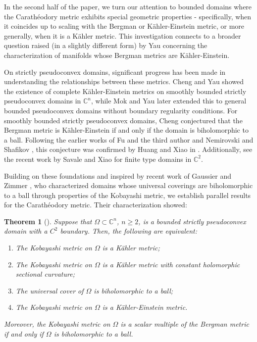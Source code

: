 \documentclass[12pt] {article}
\newtheorem{theorem}{Theorem}[section]
\numberwithin{equation}{section}
\begin{document}
In the second half of the paper, we turn our attention to bounded domains where the Carath\'eodory metric exhibits special geometric properties - specifically, when it coincides up to scaling with the Bergman or K\"ahler-Einstein metric, or more generally, when it is a K\"ahler metric. This investigation connects to a broader question raised (in a slightly different form)  by Yau \cite[pp. 679]{Yau} concerning the characterization of manifolds whose Bergman metrics are K\"{a}hler-Einstein.

 
 
\medskip



On strictly pseudoconvex domains, significant progress has been made in understanding the relationships between these metrics. Cheng and Yau \cite{CY} showed the existence of complete K\"ahler-Einstein metrics on smoothly bounded strictly pseudoconvex domains  in $\mathbb{C}^n$, while Mok and Yau \cite{MY83} later extended this to general bounded pseudoconvex domains without boundary regularity conditions. 
For smoothly bounded strictly pseudoconvex domains, Cheng conjectured that the Bergman metric is K\"{a}hler-Einstein if and only if the domain is biholomorphic to a ball. Following the earlier works of Fu and the third author \cite{FW} and Nemirovski and Shafikov \cite{NS}, this conjecture was confirmed by Huang and Xiao in \cite{HX}. Additionally, see the recent work \cite{SX} by Savale and Xiao for finite type domains in $\mathbb{C}^2$.

 
 
     \medskip
     
     
 
 
 
 
  Building on these foundations and inspired by recent work of Gaussier and Zimmer  \cite{GZ}, who characterized domains whose universal coverings are biholomorphic to a ball through properties of the Kobayashi metric, we establish parallel results for the Carath\'eodory metric. Their characterization showed:
  
  
   
\begin{theorem}[\cite{GZ}] \label{thm:spcv}
Suppose that $\Omega \subset \mathbb{C}^n$, $n \geq 2$, is a bounded strictly pseudoconvex domain with a $C^2$ boundary. Then, the following are equivalent:
\begin{enumerate}
\item [$(a)$] The Kobayashi metric on $\Omega$ is a K\"ahler metric;
\item [$(b)$] The Kobayashi metric on $\Omega$ is a K\"ahler metric with constant holomorphic sectional curvature;
\item [$(c)$] The universal cover of $\Omega$ is biholomorphic to a ball;
\item [$(d)$] The Kobayashi metric on $\Omega$ is a K\"ahler-Einstein metric.
\end{enumerate}
Moreover, the Kobayashi metric on $\Omega$ is a scalar multiple of the Bergman metric if and only if $\Omega$ is biholomorphic to a ball.
\end{theorem}
\end{document}

